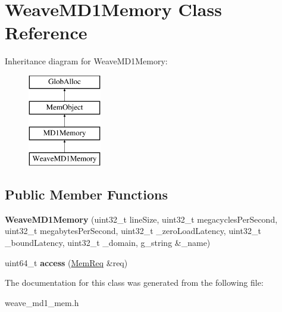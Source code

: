 \hypertarget{classWeaveMD1Memory}{\section{Weave\-M\-D1\-Memory Class Reference}
\label{classWeaveMD1Memory}
}
Inheritance diagram for Weave\-M\-D1\-Memory\-:\begin{figure}[H]
\begin{center}
\leavevmode
\includegraphics[height=4.000000cm]{classWeaveMD1Memory}
\end{center}
\end{figure}
\subsection*{Public Member Functions}
\begin{DoxyCompactItemize}
\item 
\hypertarget{classWeaveMD1Memory_a7d54394a87195d801443423d267fc492}{{\bfseries Weave\-M\-D1\-Memory} (uint32\-\_\-t line\-Size, uint32\-\_\-t megacycles\-Per\-Second, uint32\-\_\-t megabytes\-Per\-Second, uint32\-\_\-t \-\_\-zero\-Load\-Latency, uint32\-\_\-t \-\_\-bound\-Latency, uint32\-\_\-t \-\_\-domain, g\-\_\-string \&\-\_\-name)}\label{classWeaveMD1Memory_a7d54394a87195d801443423d267fc492}

\item 
\hypertarget{classWeaveMD1Memory_a10a176c26ca4380b0731006d1aa97c97}{uint64\-\_\-t {\bfseries access} (\hyperlink{structMemReq}{Mem\-Req} \&req)}\label{classWeaveMD1Memory_a10a176c26ca4380b0731006d1aa97c97}

\end{DoxyCompactItemize}


The documentation for this class was generated from the following file\-:\begin{DoxyCompactItemize}
\item 
weave\-\_\-md1\-\_\-mem.\-h\end{DoxyCompactItemize}

